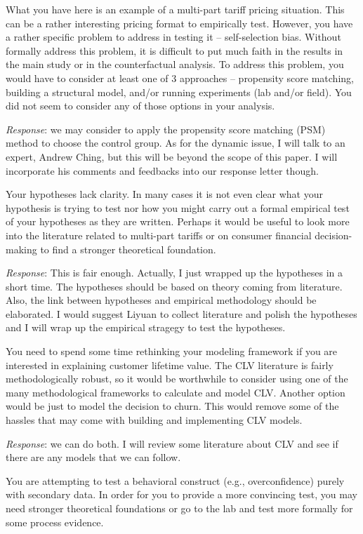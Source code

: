 \documentclass[titlepage,12pt,letterpaper]{article}
\numberwithin{equation}{section}
\begin{document}
What you have here is an example of a multi-part tariff pricing situation. This can be a rather interesting pricing format to empirically test. However, you have a rather specific problem to address in testing it – self-selection bias. Without formally address this problem, it is difficult to put much faith in the results in the main study or in the counterfactual analysis. To address this problem, you would have to consider at least one of 3 approaches – propensity score matching, building a structural model, and/or running experiments (lab and/or field). You did not seem to consider any of those options in your analysis.

\emph{Response}: we may consider to apply the propensity score matching (PSM) method to choose the control group. As for the dynamic issue, I will talk to an expert, Andrew Ching, but this will be beyond the scope of this paper. I will incorporate his comments and feedbacks into our response letter though. 

Your hypotheses lack clarity. In many cases it is not even clear what your hypothesis is trying to test nor how you might carry out a formal empirical test of your hypotheses as they are written. Perhaps it would be useful to look more into the literature related to multi-part tariffs or on consumer financial decision-making to find a stronger theoretical foundation.

\emph{Response}: This is fair enough. Actually, I just wrapped up the hypotheses in a short time. The hypotheses should be based on theory coming from literature. Also, the link between hypotheses and empirical methodology should be elaborated. I would suggest Liyuan to collect literature and polish the hypotheses and I will wrap up the empirical stragegy to test the hypotheses. 

You need to spend some time rethinking your modeling framework if you are interested in explaining customer lifetime value. The CLV literature is fairly methodologically robust, so it would be worthwhile to consider using one of the many methodological frameworks to calculate and model CLV. Another option would be just to model the decision to churn. This would remove some of the hassles that may come with building and implementing CLV models.

\emph{Response}: we can do both. I will review some literature about CLV and see if there are any models that we can follow. 

You are attempting to test a behavioral construct (e.g., overconfidence) purely with secondary data. In order for you to provide a more convincing test, you may need stronger theoretical foundations or go to the lab and test more formally for some process evidence.
\end{document}
